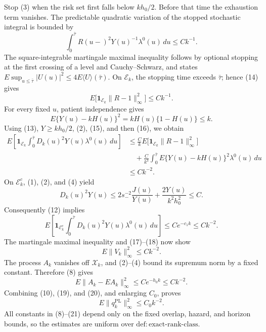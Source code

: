 Stop (3) when the risk set first falls below \(kh_0/2\).  Before that time the exhaustion term vanishes.  The predictable quadratic variation of the stopped stochastic integral is bounded by
\[
 \int_0^{\bar\tau}R(u-)^2Y(u)^{-1}\lambda^0(u)\,du
 \le Ck^{-1}.                                                 \tag{14}
\]
The square-integrable martingale maximal inequality follows by optional stopping at the first crossing of a level and Cauchy--Schwarz, and states \(E\sup_{u\le\bar\tau}|U(u)|^2\le4E\langle U\rangle(\bar\tau)\).  On \(\mathcal E_k\), the stopping time exceeds \(\bar\tau\); hence (14) gives
\[
 E\bigl[\mathbf 1_{\mathcal E_k}\|R-1\|_\infty^2\bigr]
 \le Ck^{-1}.                                                 \tag{15}
\]
For every fixed \(u\), patient independence gives
\[
 E\{Y(u)-kH(u)\}^2=kH(u)\{1-H(u)\}\le k.                  \tag{16}
\]
Using (13), \(Y\ge kh_0/2\), (2), (15), and then (16), we obtain
\[
 \begin{aligned}
 E\left[\mathbf 1_{\mathcal E_k}
   \int_0^{\bar\tau}D_k(u)^2Y(u)\lambda^0(u)\,du\right]
 &\le \frac{C}{k}E\bigl[\mathbf 1_{\mathcal E_k}\|R-1\|_\infty^2\bigr]\\
 &\quad+\frac{C}{k^3}\int_0^{\bar\tau}
       E\{Y(u)-kH(u)\}^2\lambda^0(u)\,du\\
 &\le Ck^{-2}.
 \end{aligned}                                                 \tag{17}
\]
On \(\mathcal E_k^c\), (1), (2), and (4) yield
\[
 D_k(u)^2Y(u)
 \le 2s_-^{-2}\frac{J(u)}{Y(u)}+\frac{2Y(u)}{k^2h_0^2}
 \le C.
\]
Consequently (12) implies
\[
 E\left[\mathbf 1_{\mathcal E_k^c}
   \int_0^{\bar\tau}D_k(u)^2Y(u)\lambda^0(u)\,du\right]
 \le Ce^{-c_1k}\le Ck^{-2}.                                 \tag{18}
\]
The martingale maximal inequality and (17)--(18) now show
\[
 E\|V_k\|_\infty^2\le Ck^{-2}.                              \tag{19}
\]
The process \(A_k\) vanishes off \(\mathcal X_k\), and (2)--(4) bound its supremum norm by a fixed constant.  Therefore (8) gives
\[
 E\|A_k-EA_k\|_\infty^2\le Ce^{-h_0k}\le Ck^{-2}.           \tag{20}
\]
Combining (10), (19), and (20), and enlarging \(C_0\), proves
\[
 E\|q_k^{\mathrm{PL}}\|_\infty^2\le C_0k^{-2}.             \tag{21}
\]
All constants in (8)--(21) depend only on the fixed overlap, hazard, and horizon bounds, so the estimates are uniform over \(\mathrm{def:exact\mbox{-}rank\mbox{-}class}\).

